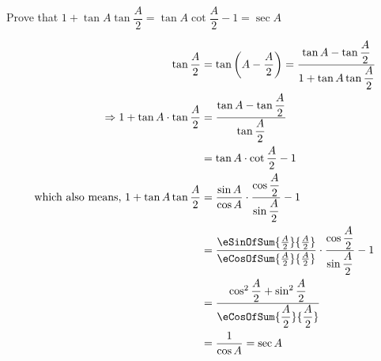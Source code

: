 
%
%
%
%
% 
% 

\question Prove that $1+\tan A\tan \dfrac{A}{2} = \tan A\cot\dfrac{A}{2} - 1 = \sec A$

\insertQR{}

\ifprintanswers
\fi 

\begin{solution}
   \begin{fullwidth}
   \begin{align}
      \tan\dfrac{A}{2} &= \tan\left( A - \dfrac{A}{2}\right) = \dfrac{\tan A - \tan\dfrac{A}{2}}{1 + \tan A\tan\dfrac{A}{2}} \\
       \Rightarrow 1 + \tan A\cdot\tan\dfrac{A}{2} &= \dfrac{\tan A-\tan\dfrac{A}{2}}{\tan\dfrac{A}{2}} \\
         &= \tan A\cdot\cot\dfrac{A}{2} - 1 \\
      \text{which also means, } 1 + \tan A\tan\dfrac{A}{2} &= 
      \dfrac{\sin A}{\cos A}\cdot\dfrac{\cos\dfrac{A}{2}}{\sin\dfrac{A}{2}} - 1 \\
      &= \dfrac{\eSinOfSum{\frac{A}{2}}{\frac{A}{2}}}{\eCosOfSum{\frac{A}{2}}{\frac{A}{2}}}\cdot
      \dfrac{\cos\dfrac{A}{2}}{\sin\dfrac{A}{2}} - 1 \\
      &= \dfrac{\cos^2 \dfrac{A}{2} + \sin^2 \dfrac{A}{2}}{\eCosOfSum{\dfrac{A}{2}}{\dfrac{A}{2}}} \\
      &= \dfrac{1}{\cos A} = \sec A
   \end{align}
   \end{fullwidth}
\end{solution}
